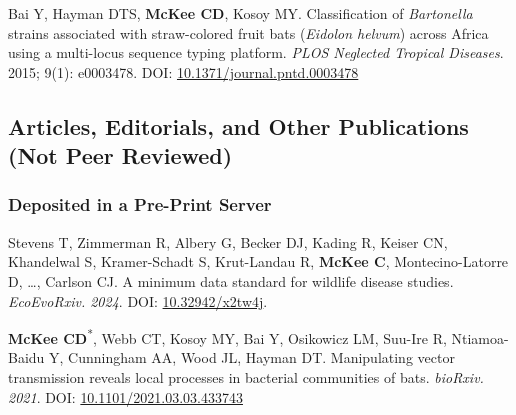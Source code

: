 \documentclass{cv}
\begin{document}
\begin{pubenum}
\item Bai Y, Hayman DTS, \textbf{McKee CD}, Kosoy MY. Classification of \textit{Bartonella} strains associated with straw-colored fruit bats (\textit{Eidolon helvum}) across Africa using a multi-locus sequence typing platform. \textit{PLOS Neglected Tropical Diseases}. 2015; 9(1): e0003478. DOI: \href{https://doi.org/10.1371/journal.pntd.0003478}{10.1371/journal.pntd.0003478}

\end{pubenum}

\subsection*{Articles, Editorials, and Other Publications (Not Peer Reviewed)}

\subsubsection*{Deposited in a Pre-Print Server}

\begin{pubenum}

\item Stevens T, Zimmerman R, Albery G, Becker DJ, Kading R, Keiser CN, Khandelwal S, Kramer-Schadt S, Krut-Landau R, \textbf{McKee C}, Montecino-Latorre D, …, Carlson CJ. A minimum data standard for wildlife disease studies. \textit{EcoEvoRxiv. 2024}. DOI: \href{https://doi.org/10.32942/x2tw4j}{10.32942/x2tw4j}.

\item \textbf{McKee CD}\textsuperscript{*}, Webb CT, Kosoy MY, Bai Y, Osikowicz LM, Suu-Ire R, Ntiamoa-Baidu Y, Cunningham AA, Wood JL, Hayman DT. Manipulating vector transmission reveals local processes in bacterial communities of bats. \textit{bioRxiv. 2021}. DOI: \href{https://doi.org/10.1101/2021.03.03.433743}{10.1101/2021.03.03.433743}

 \end{pubenum}



\end{document}

